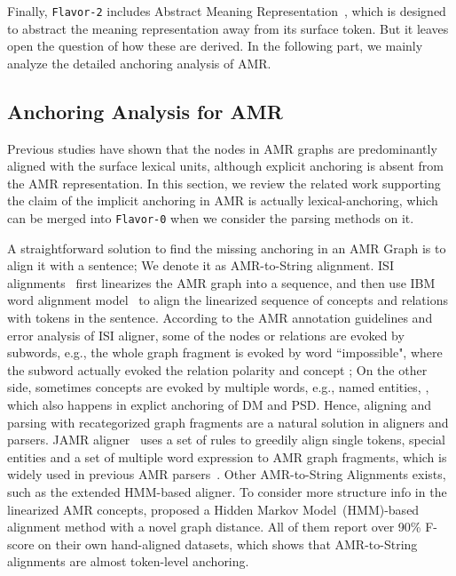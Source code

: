Finally, \texttt{Flavor-2} includes Abstract Meaning
Representation~\cite[AMR,][]{Banarescu:LWPjKI7N}, which is designed to
abstract the meaning representation away from its surface token. But
it leaves open the question of how these are derived. In the following
part, we mainly analyze the detailed anchoring analysis of AMR.

\subsection{Anchoring Analysis for AMR}
\label{ssec:lex-phr:amr-anchor}
Previous studies have shown that the nodes in AMR graphs are
predominantly aligned with the surface lexical units, although
explicit anchoring is absent from the AMR representation.  In this
section, we review the related work supporting the claim of the
implicit anchoring in AMR is actually lexical-anchoring, which can be
merged into \texttt{Flavor-0} when we consider the parsing methods on
it.

 A straightforward solution to
find the missing anchoring in an AMR Graph is to align it with a
sentence; We denote it as AMR-to-String alignment. ISI
alignments~\cite{Pourdamghani:2014aligning} first linearizes the AMR
graph into a sequence, and then use IBM word alignment
model~\cite{brown1993mathematics} to align the linearized sequence of
concepts and relations with tokens in the sentence. According to the
AMR annotation guidelines and error analysis of ISI aligner, some of
the nodes or relations are evoked by subwords, e.g., the whole graph
fragment  is evoked by word
``impossible", where the subword  actually
evoked the relation polarity and concept \tquoted{-};
On the other side, sometimes concepts are evoked by multiple words,
e.g., named entities, , which also happens
in explict anchoring of DM and PSD. Hence, aligning and parsing with
recategorized graph fragments are a natural solution in aligners and
parsers. JAMR aligner~\cite{Flanigan:2014vc} uses a set of rules to
greedily align single tokens, special entities and a set of multiple
word expression to AMR graph fragments, which is widely used in
previous AMR
parsers~\cite[\eg][]{Flanigan:2014vc,Wang:2015uo,Artzi:2009tb,Pust:2015ug,Peng:2015tj,Konstas:2017uj,Wang:2017vt}. Other
AMR-to-String Alignments exists, such as the extended HMM-based
aligner. To consider more structure info in the linearized AMR
concepts, \citet{Wang:2017vt} proposed a Hidden Markov
Model~(HMM)-based alignment method with a novel graph distance. All of
them report over 90\% F-score on their own hand-aligned datasets,
which shows that AMR-to-String alignments are almost token-level
anchoring.

